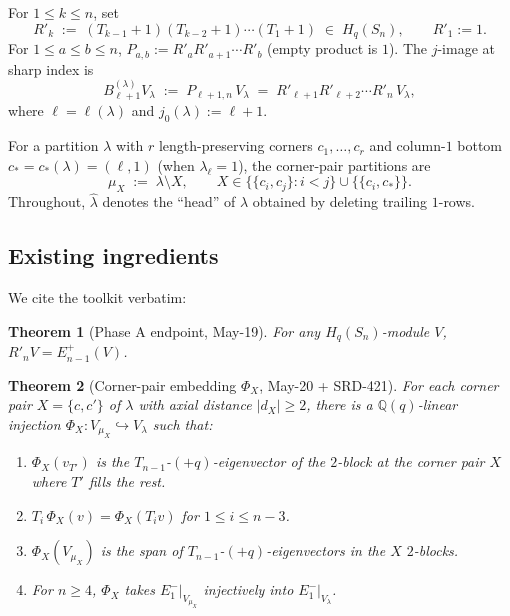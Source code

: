 \documentclass[11pt]{article}
\newtheorem{theorem}{Theorem}
\theoremstyle{definition}
\begin{document}
For $1 \le k \le n$, set
\[
   R'_k \;:=\; (T_{k-1}{+}1)(T_{k-2}{+}1)\cdots(T_1{+}1) \;\in\; H_q(S_n),
   \qquad R'_1 := 1.
\]
For $1 \le a \le b \le n$, $P_{a, b} := R'_a R'_{a+1} \cdots R'_b$
(empty product is $1$). The $j$-image at sharp index is
\[
   B_{\ell+1}^{(\lambda)} V_\lambda \;:=\; P_{\ell+1, n}\, V_\lambda
   \;=\; R'_{\ell+1} R'_{\ell+2} \cdots R'_n\, V_\lambda,
\]
where $\ell = \ell(\lambda)$ and $j_0(\lambda) := \ell + 1$.

For a partition $\lambda$ with $r$ length-preserving corners
$c_1, \ldots, c_r$ and column-$1$ bottom $c_* = c_*(\lambda) =
(\ell, 1)$ (when $\lambda_\ell = 1$), the corner-pair partitions are
\[
   \mu_X \;:=\; \lambda \setminus X, \qquad X \in \{ \{c_i, c_j\} : i < j \} \cup
   \{ \{c_i, c_*\} \}.
\]
Throughout, $\widehat\lambda$ denotes the ``head'' of $\lambda$ obtained
by deleting trailing $1$-rows.

\subsection{Existing ingredients}\label{ssec:ingredients}

We cite the toolkit verbatim:

\begin{theorem}[Phase A endpoint, May-19]\label{thm:phaseA}
For any $H_q(S_n)$-module $V$, $R'_n V = E_{n-1}^+(V)$.
\end{theorem}

\begin{theorem}[Corner-pair embedding $\Phi_X$, May-20 + SRD-421]\label{thm:Phi}
For each corner pair $X = \{c, c'\}$ of $\lambda$ with axial distance
$|d_X| \ge 2$, there is a $\mathbb{Q}(q)$-linear injection
$\Phi_X : V_{\mu_X} \hookrightarrow V_\lambda$ such that:
\begin{enumerate}[leftmargin=2em,topsep=0.2em,itemsep=0.1em]
\item $\Phi_X(v_{T'})$ is the $T_{n-1}$-$(+q)$-eigenvector of the
$2$-block at the corner pair $X$ where $T'$ fills the rest.
\item $T_i \, \Phi_X(v) = \Phi_X(T_i v)$ for $1 \le i \le n - 3$.
\item $\Phi_X(V_{\mu_X})$ is the span of $T_{n-1}$-$(+q)$-eigenvectors
in the $X$ $2$-blocks.
\item For $n \ge 4$, $\Phi_X$ takes $E_1^-|_{V_{\mu_X}}$ injectively into
$E_1^-|_{V_\lambda}$.
\end{enumerate}
\end{theorem}
\end{document}
